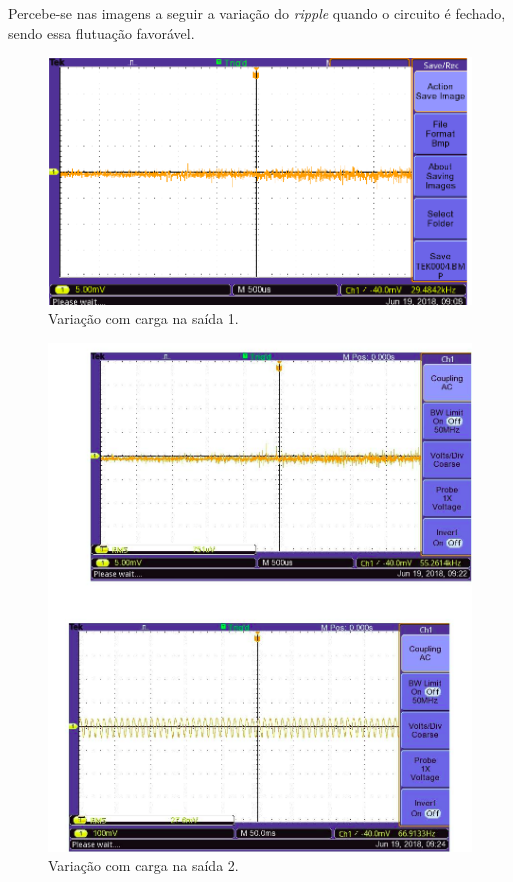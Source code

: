 Percebe-se nas imagens a seguir a variação do \textit{ripple} quando o circuito é fechado, sendo essa flutuação favorável.

\begin{figure}[H]
	\centering
	\includegraphics[width=14cm]{figuras/variacao1.png}
	\caption{Variação com carga na saída 1.}
	\label{variacao1}
\end{figure}

\begin{figure}[!htb]
	\centering
	\includegraphics[width=14cm]{figuras/variacao2.png}
	\caption{Variação com carga na saída 2.}
	\label{variacao2}
\end{figure}

